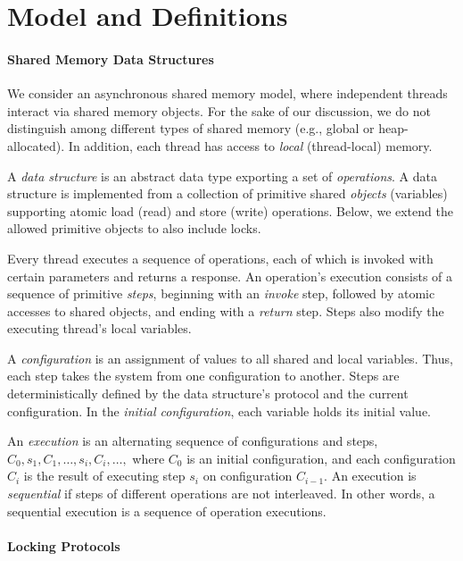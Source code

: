\section{Model and Definitions}\label{sec:model}


\paragraph{Shared Memory Data Structures}

We consider an asynchronous shared memory model, where independent threads interact via shared memory objects.
For the sake of our discussion, we do not distinguish among different types of shared memory (e.g., global or heap-allocated). 
In addition, each thread has access to \emph{local} (thread-local) memory.

A \emph{data structure} is an abstract data type exporting a set of \emph{operations}.
A data structure is implemented from a collection of primitive shared \emph{objects} (variables) supporting atomic load (read) and store (write) operations.
Below, we extend the allowed primitive objects to also include locks. 

Every thread executes a sequence of operations, each of which is invoked with certain parameters and returns a response.
An operation's execution consists of a sequence of primitive \emph{steps}, beginning with an \emph{invoke} step, followed by 
atomic accesses to shared objects, and ending with a \emph{return} step. Steps also modify the executing thread's local variables.

A \emph{configuration} is an assignment of values to all shared and local variables. Thus, each step takes the system from one 
configuration to another. Steps are deterministically defined by the data structure's protocol and the current configuration. 
In the \emph{initial configuration}, each variable holds its initial value. 

An \emph{execution} is an alternating sequence of configurations and steps,
$C_0,s_1,C_1, \ldots,s_i,C_i,\ldots,$ 
where $C_0$ is an initial configuration,
and each configuration $C_i$ is the result of
executing step $s_i$ on configuration $C_{i-1}$.
An execution is \emph{sequential} if steps of different operations are not interleaved. 
In other words, a sequential execution is a sequence of operation executions.

\paragraph{Locking Protocols}

